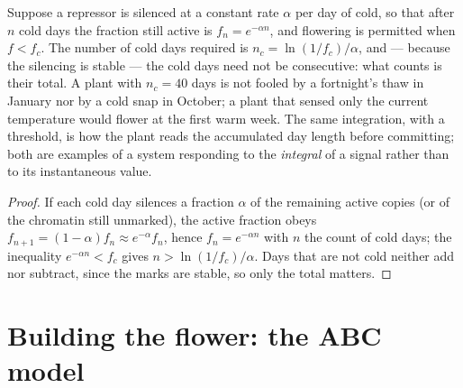 \begin{theorem}\label{thm:b2:plant-flowering:integration}
Suppose a repressor is silenced at a constant rate $\alpha$ per day
of cold, so that after $n$ cold days the fraction still active is
$f_n = e^{-\alpha n}$, and flowering is permitted when $f < f_c$.
The number of cold days required is $n_c = \ln(1/f_c)/\alpha$, and
--- because the silencing is stable --- the cold days need not be
consecutive: what counts is their total. A plant with $n_c = 40$
days is not fooled by a fortnight's thaw in January nor by a cold
snap in October; a plant that sensed only the current temperature
would flower at the first warm week. The same integration, with a
threshold, is how the plant reads the accumulated day length before
committing; both are examples of a system responding to the
\emph{integral} of a signal rather than to its instantaneous value.
\end{theorem}
\begin{proof}
If each cold day silences a fraction $\alpha$ of the remaining
active copies (or of the chromatin still unmarked), the active
fraction obeys $f_{n+1} = (1 - \alpha)f_n \approx e^{-\alpha}f_n$,
hence $f_n = e^{-\alpha n}$ with $n$ the count of cold days; the
inequality $e^{-\alpha n} < f_c$ gives $n > \ln(1/f_c)/\alpha$.
Days that are not cold neither add nor subtract, since the marks
are stable, so only the total matters.
\end{proof}

\section{Building the flower: the ABC model}

